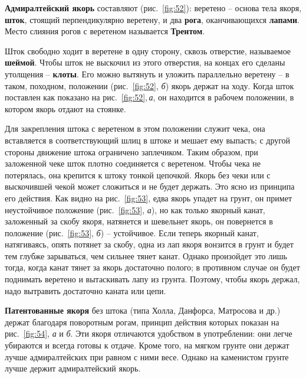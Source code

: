 \documentclass[a4paper, 12pt, twoside, final]{scrbook}
\begin{document}
\textbf{Адмиралтейский якорь} составляют (рис.~\ref{fig:52}): веретено \--- основа тела якоря, \textbf{шток}, стоящий перпендикулярно веретену, и два \textbf{рога}, оканчивающихся \textbf{лапами}. Место слияния рогов с веретеном называется \textbf{Трентом}.{\sloppy\par}

Шток свободно ходит в веретене в одну сторону, сквозь отверстие, называемое \textbf{шеймой}. Чтобы шток не выскочил из этого отверстия, на концах его сделаны утолщения \--- \textbf{клоты}. Его можно вытянуть и уложить параллельно веретену \--- в таком, походном, положении (рис.~\ref{fig:52}, \textit{б}) якорь держат на ходу. Когда шток поставлен как показано на рис.~\ref{fig:52},\,\textit{а}, он находится в рабочем положении, в котором якорь отдают на стоянке.

Для закрепления штока с веретеном в этом положении служит чека, она вставляется в соответствующий шлиц в штоке и мешает ему выпасть; с другой стороны движение штока ограничено заплечиком. Таким образом, при заложенной чеке шток плотно соединяется с веретеном. Чтобы чека не потерялась, она крепится к штоку тонкой цепочкой. Якорь без чеки или с выскочившей чекой может сложиться и не будет держать. Это ясно из принципа его действия. Как видно на рис.~\ref{fig:53}, едва якорь упадет на грунт, он примет неустойчивое положение (рис.~\ref{fig:53}, \textit{а}), но как только якорный канат, заложенный за скобу якоря, натянется и шевельнет якорь, он повернется в положение (рис.~\ref{fig:53}, \textit{б}) \--- устойчивое. Если теперь якорный канат, натягиваясь, опять потянет за скобу, одна из лап якоря вонзится в грунт и будет тем глубже зарываться, чем сильнее тянет канат. Однако произойдет это лишь тогда, когда канат тянет за якорь достаточно полого; в противном случае он будет поднимать веретено и вытаскивать лапу из грунта. Поэтому, чтобы якорь держал, надо вытравить достаточно каната или цепи.

\textbf{Патентованные якоря} без штока (типа Холла, Данфорса, Матросова и др.) держат благодаря поворотным рогам, принцип действия которых показан на рис.~\ref{fig:54}, \textit{а} и \textit{б}. Эти якоря отличаются удобством в употреблении: они легче убираются и всегда готовы к отдаче. Кроме того, на мягком грунте они держат лучше адмиралтейских при равном с ними весе. Однако на каменистом грунте лучше держит адмиралтейский якорь.
\end{document}
